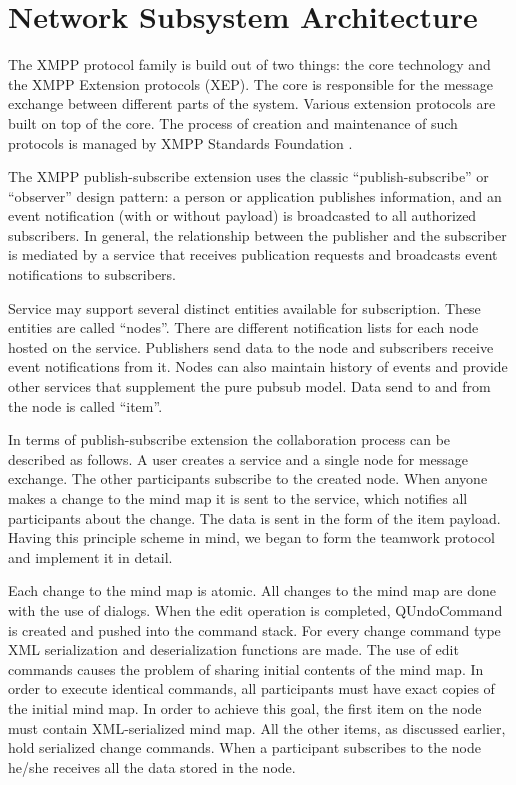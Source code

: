 \section{Network Subsystem Architecture}

The XMPP protocol family is build out of two things: the core technology and the
XMPP Extension protocols (XEP). The core is responsible for the message exchange
between different parts of the system. Various extension protocols are built on
top of the core. The process of creation and maintenance of such protocols is
managed by XMPP Standards Foundation \cite{xmpp-standarts}.

The XMPP publish-subscribe extension \cite{xep-0060} uses the classic
``publish-subscribe'' or ``observer'' design pattern: a person or application
publishes information, and an event notification (with or without payload) is
broadcasted to all authorized subscribers. In general, the relationship between
the publisher and the subscriber is mediated by a service that receives
publication requests and broadcasts event notifications to subscribers.

Service may support several distinct entities available for subscription. These
entities are called ``nodes''. There are different notification lists for each
node hosted on the service. Publishers send data to the node and subscribers
receive event notifications from it. Nodes can also maintain history of events
and provide other services that supplement the pure pubsub model. Data send to
and from the node is called ``item''.

In terms of publish-subscribe extension the collaboration process can be
described as follows. A user creates a service and a single node for message
exchange. The other participants subscribe to the created node. When anyone
makes a change to the mind map it is sent to the service, which notifies all
participants about the change. The data is sent in the form of the item
payload. Having this principle scheme in mind, we began to form the teamwork
protocol and implement it in detail.

Each change to the mind map is atomic. All changes to the mind map are done with
the use of dialogs. When the edit operation is completed, QUndoCommand is
created and pushed into the command stack. For every change command type XML
serialization and deserialization functions are made.  The use of edit commands
causes the problem of sharing initial contents of the mind map. In order to
execute identical commands, all participants must have exact copies of the
initial mind map. In order to achieve this goal, the first item on the node must
contain XML-serialized mind map. All the other items, as discussed earlier, hold
serialized change commands.  When a participant subscribes to the node he/she
receives all the data stored in the node.

